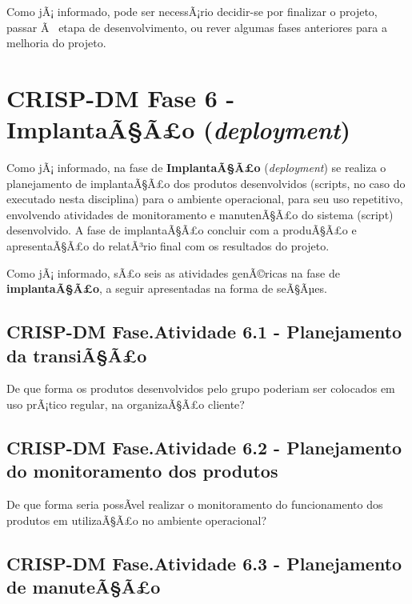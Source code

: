 \documentclass[]{article}
\begin{document}
Como jÃ¡ informado, pode ser necessÃ¡rio decidir-se por finalizar o
projeto, passar Ã~ etapa de desenvolvimento, ou rever algumas fases
anteriores para a melhoria do projeto.

\section{\texorpdfstring{CRISP-DM Fase 6 - \textbf{ImplantaÃ§Ã£o}
(\emph{deployment})}{CRISP-DM Fase 6 - ImplantaÃ§Ã£o (deployment)}}\label{crisp-dm-fase-6---implantaaao-deployment}

Como jÃ¡ informado, na fase de \textbf{ImplantaÃ§Ã£o}
(\emph{deployment}) se realiza o planejamento de implantaÃ§Ã£o dos
produtos desenvolvidos (scripts, no caso do executado nesta disciplina)
para o ambiente operacional, para seu uso repetitivo, envolvendo
atividades de monitoramento e manutenÃ§Ã£o do sistema (script)
desenvolvido. A fase de implantaÃ§Ã£o concluir com a produÃ§Ã£o e
apresentaÃ§Ã£o do relatÃ³rio final com os resultados do projeto.

Como jÃ¡ informado, sÃ£o seis as atividades genÃ©ricas na fase de
\textbf{implantaÃ§Ã£o}, a seguir apresentadas na forma de seÃ§Ãµes.

\subsection{CRISP-DM Fase.Atividade 6.1 - Planejamento da
transiÃ§Ã£o}\label{crisp-dm-fase.atividade-6.1---planejamento-da-transiaao}

De que forma os produtos desenvolvidos pelo grupo poderiam ser colocados
em uso prÃ¡tico regular, na organizaÃ§Ã£o cliente?

\subsection{CRISP-DM Fase.Atividade 6.2 - Planejamento do monitoramento
dos
produtos}\label{crisp-dm-fase.atividade-6.2---planejamento-do-monitoramento-dos-produtos}

De que forma seria possÃ­vel realizar o monitoramento do funcionamento
dos produtos em utilizaÃ§Ã£o no ambiente operacional?

\subsection{CRISP-DM Fase.Atividade 6.3 - Planejamento de
manuteÃ§Ã£o}\label{crisp-dm-fase.atividade-6.3---planejamento-de-manuteaao}
\end{document}
